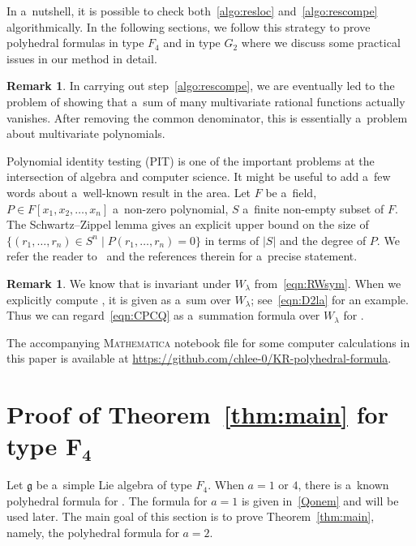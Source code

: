 \documentclass[pdftex]{sigma}
\numberwithin{equation}{section}
\theoremstyle{definition}
\newtheorem{Remark}[Theorem]{Remark}
\newcommand{\g}{\mathfrak{g}}
\newcommand{\res}{\operatorname{res}}
\newcommand\Wam{W^{(a)}_{m}}
\newcommand\Qa{\mathcal{Q}^{(a)}}
\newcommand\Pa{\mathcal{P}^{(a)}}
\newcommand\la{\lambda}
\begin{document}
In a~nutshell, it is possible to check both~\ref{algo:resloc} and~\ref{algo:rescompe} algorithmically.
In the following sections, we follow this strategy to prove polyhedral formulas in type $F_4$ and in type $G_2$ where we discuss some practical issues in our method in detail.

\begin{Remark}\label{rem:szlemma}
In carrying out step~\ref{algo:rescompe},
we are eventually led to the problem of showing that a~sum of many multivariate rational functions actually vanishes.
After removing the common denominator, this is essentially a~problem about multivariate polynomials.

Polynomial identity testing (PIT) is one of the important problems
at the intersection of algebra and computer science.
It might be useful to add a~few words about a~well-known result in the area.
Let $F$ be a~field, $P\in F[x_1,x_2,\ldots,x_n]$ a~non-zero polynomial, $S$ a~finite non-empty subset of $F$.
The Schwartz--Zippel lemma gives an explicit upper bound on the size of~${\{(r_1,\dots,r_n)\in S^{n} \mid P(r_1,\ldots,r_n)=0\}}$
in terms of $|S|$ and the degree of $P$.
We refer the reader to~\cite{MR3788163} and the references therein for a~precise statement.
\end{Remark}


\begin{Remark}
We know that \smash{$C\bigl(\Qa,\la,\zeta,l\bigr)$} is invariant under $W_{\la}$ from~\eqref{eqn:RWsym}. When we explicitly compute \smash{$C\bigl(\Pa,\la,\zeta,l\bigr)$}, it is given as a~sum over $W_{\la}$; see~\eqref{eqn:D2la} for an example. Thus we can regard~\eqref{eqn:CPCQ} as a~summation formula over $W_{\la}$ for \smash{$C\bigl(\Qa,\la,\zeta,l\bigr)$}.
\end{Remark}

The accompanying \textsc{Mathematica} notebook file for some computer calculations in this paper is available at \url{https://github.com/chlee-0/KR-polyhedral-formula}.

\section[Proof of Theorem 1.1 for type F\_4]{Proof of Theorem~\ref{thm:main} for type $\boldsymbol{F_4}$}\label{sec:f4}
Let $\g$ be a~simple Lie algebra of type $F_4$. When $a=1$ or $4$, there is a~known polyhedral formula for \smash{$\res \Wam$}. The formula for $a=1$ is given in~\eqref{Qonem} and will be used later. The main goal of this section is to prove Theorem~\ref{thm:main}, namely, the polyhedral formula for $a=2$.
\end{document}
